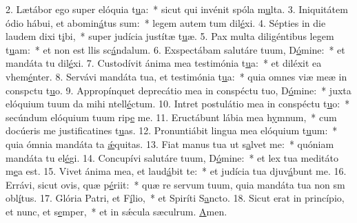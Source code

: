 2. Lætábor ego super elóquia t\uline{u}a:~* sicut qui invénit spóla m\uline{u}lta.
3. Iniquitátem ódio hábui, et abomin\uline{á}tus sum:~* legem autem tum dil\uline{é}xi.
4. Sépties in die laudem dixi t\uline{i}bi,~* super judícia justítæ t\uline{u}æ.
5. Pax multa diligéntibus legem t\uline{u}am:~* et non est llis sc\uline{á}ndalum.
6. Exspectábam salutáre tuum, D\uline{ó}mine:~* et mandáta tu dil\uline{é}xi.
7. Custodívit ánima mea testimónia t\uline{u}a:~* et diléxit ea vhem\uline{é}nter.
8. Servávi mandáta tua, et testimónia t\uline{u}a:~* quia omnes viæ meæ in conspctu t\uline{u}o.
9. Appropínquet deprecátio mea in conspéctu tuo, D\uline{ó}mine:~* juxta elóquium tuum da mihi ntell\uline{é}ctum.
10. Intret postulátio mea in conspéctu t\uline{u}o:~* secúndum elóquium tuum rip\uline{e} me.
11. Eructábunt lábia mea h\uline{y}mnum,~* cum docúeris me justificatines t\uline{u}as.
12. Pronuntiábit lingua mea elóquium t\uline{u}um:~* quia ómnia mandáta ta \uline{ǽ}quitas.
13. Fiat manus tua ut s\uline{a}lvet me:~* quóniam mandáta tu el\uline{é}gi.
14. Concupívi salutáre tuum, D\uline{ó}mine:~* et lex tua meditáto m\uline{e}a est.
15. Vivet ánima mea, et laud\uline{á}bit te:~* et judícia tua djuv\uline{á}bunt me.
16. Errávi, sicut ovis, quæ p\uline{é}riit:~* quæ re servum tuum, quia mandáta tua non sm obl\uline{í}tus.
17. Glória Patri, et F\uline{í}lio,~* et Spiríti S\uline{a}ncto.
18. Sicut erat in princípio, et nunc, et s\uline{e}mper,~* et in sǽcula sæculrum. \uline{A}men.
